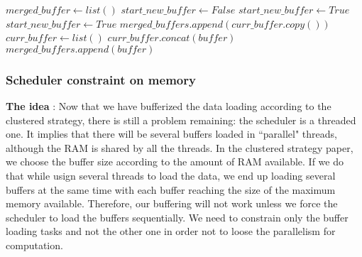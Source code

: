 \documentclass[conference]{IEEEtran}
\begin{document}
\begin{algorithm}
  \caption{$concat\_rows()$}
  \label{algo:concatrows}
  \begin{algorithmic}
    \STATE $merged\_buffer \leftarrow list()$
        \STATE $start\_new\_buffer \leftarrow False$
          \STATE $start\_new\_buffer \leftarrow True$
        \ENDIF
          \STATE $start\_new\_buffer \leftarrow True$
        \ENDIF
          \STATE $merged\_buffers.append(curr\_buffer.copy())$
          \STATE $curr\_buffer \leftarrow list()$
        \ENDIF
        \STATE $curr\_buffer.concat(buffer)$
      \ELSE
        \STATE $merged\_buffers.append(buffer)$ 
      \ENDIF
    \ENDFOR
  \end{algorithmic}
\end{algorithm}

\subsubsection{Scheduler constraint on memory}
\textbf{The idea} :
Now that we have bufferized the data loading according to the clustered strategy, there is still a problem remaining: the scheduler is a threaded one. It implies that there will be several buffers loaded in ``parallel" threads, although the RAM is shared by all the threads. In the clustered strategy paper, we choose the buffer size according to the amount of RAM available. If we do that while usign several threads to load the data, we end up loading several buffers at the same time with each buffer reaching the size of the maximum memory available. Therefore, our buffering will not work unless we force the scheduler to load the buffers sequentially. We need to constrain only the buffer loading tasks and not the other one in order not to loose the parallelism for computation. \\

\end{document}
